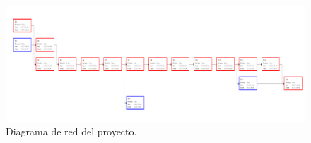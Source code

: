 \begin{figure}
	\centering
	\includegraphics[width=\textheight, angle=-90]{fig/web}
	\caption{Diagrama de red del proyecto.}\label{fig:web}
\end{figure}
